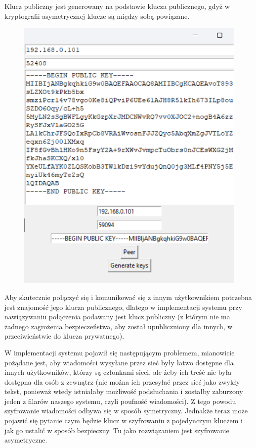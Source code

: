 Klucz publiczny jest generowany na podstawie klucza publicznego, gdyż w kryptografii asymetrycznej klucze są między sobą powiązane.
\begin{figure}[H]
    \centering
    \includegraphics[width=\textwidth]{Images/CodeX13.png}
\end{figure}
Aby skutecznie połączyć się i komunikować się z innym użytkownikiem potrzebna jest znajomość jego klucza publicznego, dlatego w implementacji systemu przy nawiązywaniu połączenia podawany jest klucz publiczny (z którym nie ma żadnego zagrożenia bezpieczeństwa, aby został upubliczniony dla innych, w przeciwieństwie do klucza prywatnego).

\vspace{0.3\baselineskip}

W implementacji systemu pojawił się następującym problemem, mianowicie pożądane jest, aby wiadomości wysyłane przez sieć były łatwo dostępne dla innych użytkowników, którzy są członkami sieci, ale żeby ich treść nie była dostępna dla osób z zewnątrz (nie można ich przesyłać przez sieć jako zwykły tekst, ponieważ wtedy istniałaby możliwość podsłuchania i zostałby zaburzony jeden z filarów naszego systemu, czyli poufność wiadomości). Z tego powodu szyfrowanie wiadomości odbywa się w sposób symetryczny. Jednakże teraz może pojawić się pytanie czym będzie klucz w szyfrowaniu z pojedynczym kluczem i jak go ustalić w sposób bezpieczny. Tu jako rozwiązaniem jest szyfrowanie asymetryczne.

